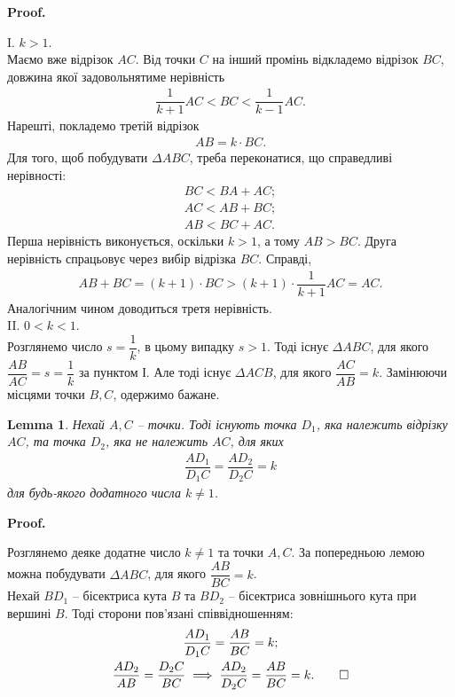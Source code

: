 \documentclass[a4paper, 10pt]{article}
\makeatletter
\theoremstyle{theoremdd}
\theoremstyle{theoremdd}
\theoremstyle{theoremdd}
\theoremstyle{theoremdd}
\theoremstyle{theoremdd}
\theoremstyle{theoremdd}
\theoremstyle{theoremdd}
\theoremstyle{theoremdd}
\newtheorem{lemma}[theorem]{Lemma}
\theoremstyle{theoremdd}
\renewenvironment{proof}[1][Proof.\\]{\par
\pushQED{\hfill \qed}%
\normalfont \topsep6\p@\@plus6\p@\relax
\trivlist
\item\relax
{\bfseries
#1\@addpunct{.}}\hspace\labelsep\ignorespaces
}{%
\popQED\endtrivlist\@endpefalse
}
\makeatother
\begin{document}
\begin{proof}
I. \textit{$k > 1$}.\\
Маємо вже відрізок $AC$. Від точки $C$ на інший промінь відкладемо відрізок $BC$, довжина якої задовольнятиме нерівність
\begin{align*}
\dfrac{1}{k+1} AC < BC < \dfrac{1}{k-1} AC.
\end{align*}
Нарешті, покладемо третій відрізок
\begin{align*}
AB = k \cdot BC.
\end{align*}
Для того, щоб побудувати $\Delta ABC$, треба переконатися, що справедливі нерівності:
\begin{align*}
BC < BA + AC; \\
AC < AB + BC; \\
AB < BC + AC.
\end{align*}
Перша нерівність виконується, оскільки $k > 1$, а тому $AB > BC$. Друга нерівність спрацьовує через вибір відрізка $BC$. Справді,
\begin{align*}
AB + BC = (k+1) \cdot BC > (k+1) \cdot \dfrac{1}{k+1} AC = AC.
\end{align*}
Аналогічним чином доводиться третя нерівність.
\bigskip \\
II. \textit{$0 < k < 1$}.\\
Розглянемо число $s = \dfrac{1}{k}$, в цьому випадку $s > 1$. Тоді існує $\Delta ABC$, для якого $\dfrac{AB}{AC} = s = \dfrac{1}{k}$ за пунктом І. Але тоді існує $\Delta ACB$, для якого $\dfrac{AC}{AB} = k$. Замінюючи місцями точки $B,C$, одержимо бажане. 
\end{proof}

\begin{lemma}
Нехай $A,C$ -- точки. Тоді існують точка $D_1$, яка належить відрізку $AC$, та точка $D_2$, яка не належить $AC$, для яких
\begin{align*}
\dfrac{AD_1}{D_1C} = \dfrac{AD_2}{D_2C} = k
\end{align*}
для будь-якого додатного числа $k \neq 1$.
\end{lemma}

\begin{proof}
Розглянемо деяке додатне число $k \neq 1$ та точки $A,C$. За попередньою лемою можна побудувати $\Delta ABC$, для якого $\dfrac{AB}{BC} = k$.\\
Нехай $BD_1$ -- бісектриса кута $B$ та $BD_2$ -- бісектриса зовнішнього кута при вершині $B$. Тоді сторони пов'язані співвідношенням:
\begin{gather*}
\dfrac{AD_1}{D_1C} = \dfrac{AB}{BC} = k; \\
\dfrac{AD_2}{AB} = \dfrac{D_2 C}{BC} \implies \dfrac{AD_2}{D_2 C} = \dfrac{AB}{BC} = k. \qedhere
\end{gather*}
\end{proof}
\end{document}
